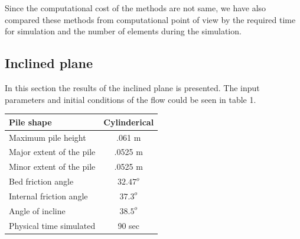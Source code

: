 \documentclass[letterpaper,10pt]{article}
\begin{document}
Since the computational cost of the methods are not same, we have also compared these methods from computational point of view by the required time for simulation and the number of elements during the simulation. 
\subsection{Inclined plane}
In this section the results of the inclined plane is presented. The input parameters and initial conditions of the flow could be seen in  table 1.
\begin{center}
        \begin{tabular}{|l|c|}
                \hline
                Pile shape       & Cylinderical \\
                \hline
                Maximum pile height       & .061 m \\
                \hline
                Major extent of the pile  & .0525 m \\
                \hline
                Minor extent of the pile  & .0525 m \\
                \hline           
                Bed friction angle        & $32.47^o$ \\
                \hline
                Internal friction angle  & $37.3^o$ \\
                \hline
                Angle of incline          & $38.5^o$ \\
                \hline
                Physical time simulated   &  90 sec \\
                \hline
        \end{tabular}
\end{center}
\end{document}
